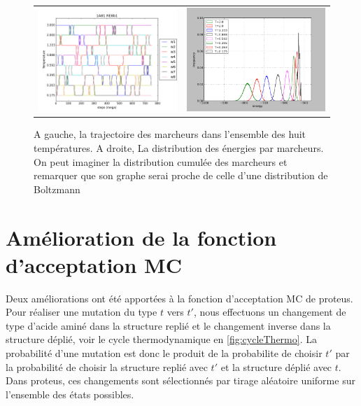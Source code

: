    \begin{figure}[!htbp]
     \centering
     \begin{tabular}{cc}
       \includegraphics[width=8cm]{figure/re8_Ttraj.png}  &
       \includegraphics[width=8cm]{figure/re8_distri.png}  &
     \end{tabular}     
     \caption{ A gauche, la trajectoire des marcheurs dans l'ensemble des huit températures. A droite, La distribution des énergies par marcheurs. On peut imaginer la distribution cumulée des marcheurs et remarquer que son graphe serai proche de celle d'une distribution de Boltzmann}
\label{fig:proteusREMC}
   \end{figure}
   

   \section{Amélioration de la fonction d'acceptation MC}

   Deux améliorations ont été apportées à la fonction d'acceptation MC de proteus. Pour réaliser une mutation du type $t$ vers $t'$, nous effectuons un changement de type d'acide aminé dans la structure replié et le changement inverse dans la structure déplié, voir le cycle thermodynamique en \ref{fig:cycleThermo}. La probabilité d'une mutation est donc le produit de la probabilite de choisir $t'$ par la probabilité de choisir la structure replié avec $t'$ et la structure déplié avec $t$. Dans proteus, ces changements sont sélectionnés par tirage aléatoire uniforme sur l'ensemble des états possibles. 

